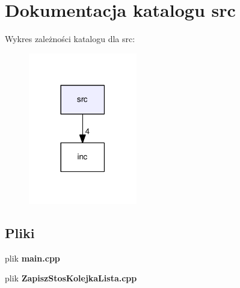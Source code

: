 \section{Dokumentacja katalogu src}
\label{dir_68267d1309a1af8e8297ef4c3efbcdba}
Wykres zależności katalogu dla src\-:\nopagebreak
\begin{figure}[H]
\begin{center}
\leavevmode
\includegraphics[width=134pt]{dir_68267d1309a1af8e8297ef4c3efbcdba_dep}
\end{center}
\end{figure}
\subsection*{Pliki}
\begin{DoxyCompactItemize}
\item 
plik {\bf main.\-cpp}
\item 
plik {\bf Zapisz\-Stos\-Kolejka\-Lista.\-cpp}
\end{DoxyCompactItemize}
